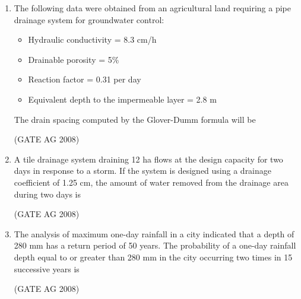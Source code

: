 \documentclass[journal]{IEEEtran}
\begin{document}
\begin{enumerate}
\medskip

\item 
 The following data were obtained from an agricultural land requiring a pipe drainage system for groundwater control:
\begin{itemize}
\item Hydraulic conductivity = 8.3 cm/h
\item Drainable porosity = 5\%
\item Reaction factor = 0.31 per day
\item Equivalent depth to the impermeable layer = 2.8 m
\end{itemize}

The drain spacing computed by the Glover-Dumm formula will be
\begin{enumerate}
\end{enumerate}
\hfill(GATE AG 2008)\\

\medskip

\item 
 A tile drainage system draining 12 ha flows at the design capacity for two days in response to a storm. If the system is designed using a drainage coefficient of 1.25 cm, the amount of water removed from the drainage area during two days is
\begin{enumerate}
\end{enumerate}
\hfill(GATE AG 2008)\\

\medskip

\item 
 The analysis of maximum one-day rainfall in a city indicated that a depth of 280 mm has a return period of 50 years. The probability of a one-day rainfall depth equal to or greater than 280 mm in the city occurring two times in 15 successive years is
\begin{enumerate}
\end{enumerate}
\hfill(GATE AG 2008)\\


\end{enumerate}
\end{document}
